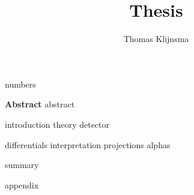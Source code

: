 \documentclass[draftmode]{main}
\begin{document}
\title{Thesis}
\author{Thomas Klijnsma}
\maketitle

{numbers}

\textbf{Abstract}
{abstract}

\tableofcontents

{introduction}
{theory}
{detector}

{differentials}
{interpretation}
{projections}
{alphas}

{summary}




\appendix
{appendix}
\end{document}
